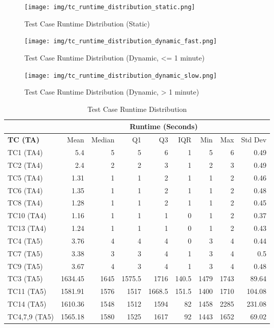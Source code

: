 \begin{figure}[ht]
  \centering
  \texttt{[image: img/tc\_runtime\_distribution\_static.png]}
  \caption{Test Case Runtime Distribution (Static)}
  \label{fig:tc_runtime_distribution_static}
\end{figure}

\begin{figure}[ht]
  \centering
  \texttt{[image: img/tc\_runtime\_distribution\_dynamic\_fast.png]}
  \caption{Test Case Runtime Distribution (Dynamic, <= 1 minute)}
  \label{fig:tc_runtime_distribution_dynamic_fast}
\end{figure}

\begin{figure}[ht]
  \centering
  \texttt{[image: img/tc\_runtime\_distribution\_dynamic\_slow.png]}
  \caption{Test Case Runtime Distribution (Dynamic, > 1 minute)}
  \label{fig:tc_runtime_distribution_dynamic_slow}
\end{figure}

\begin{table}[h!]
  \begin{tabular}{|l|r|r|r|r|r|r|r|r|}
    \hline
    & \multicolumn{8}{c|}{\textbf{Runtime (Seconds)}} \\
    \hline
    \textbf{TC (TA)} & Mean & Median & Q1 & Q3 & IQR & Min & Max & Std Dev \\
    \hline
    TC1 (TA4) & 5.4 & 5 & 5 & 6 & 1 & 5 & 6 & 0.49 \\
    \hline
    TC2 (TA4) & 2.4 & 2 & 2 & 3 & 1 & 2 & 3 & 0.49 \\
    \hline
    TC5 (TA4) & 1.31 & 1 & 1 & 2 & 1 & 1 & 2 & 0.46 \\
    \hline
    TC6 (TA4) & 1.35 & 1 & 1 & 2 & 1 & 1 & 2 & 0.48 \\
    \hline
    TC8 (TA4) & 1.28 & 1 & 1 & 2 & 1 & 1 & 2 & 0.45 \\
    \hline
    TC10 (TA4) & 1.16 & 1 & 1 & 1 & 0 & 1 & 2 & 0.37 \\
    \hline
    TC13 (TA4) & 1.24 & 1 & 1 & 1 & 0 & 1 & 2 & 0.43 \\
    \hline
    TC4 (TA5) & 3.76 & 4 & 4 & 4 & 0 & 3 & 4 & 0.44 \\
    \hline
    TC7 (TA5) & 3.38 & 3 & 3 & 4 & 1 & 3 & 4 & 0.5 \\
    \hline
    TC9 (TA5) & 3.67 & 4 & 3 & 4 & 1 & 3 & 4 & 0.48 \\
    \hline
    TC3 (TA5) & 1634.45 & 1645 & 1575.5 & 1716 & 140.5 & 1479 & 1743 & 89.64 \\
    \hline
    TC11 (TA5) & 1581.91 & 1576 & 1517 & 1668.5 & 151.5 & 1400 & 1710 & 104.08 \\
    \hline
    TC14 (TA5) & 1610.36 & 1548 & 1512 & 1594 & 82 & 1458 & 2285 & 231.08 \\
    \hline
    TC4,7,9 (TA5) & 1565.18 & 1580 & 1525 & 1617 & 92 & 1443 & 1652 & 69.02 \\
    \hline
  \end{tabular}
  \caption{Test Case Runtime Distribution}
  \label{tab:tc_runtime_distribution}
\end{table}
